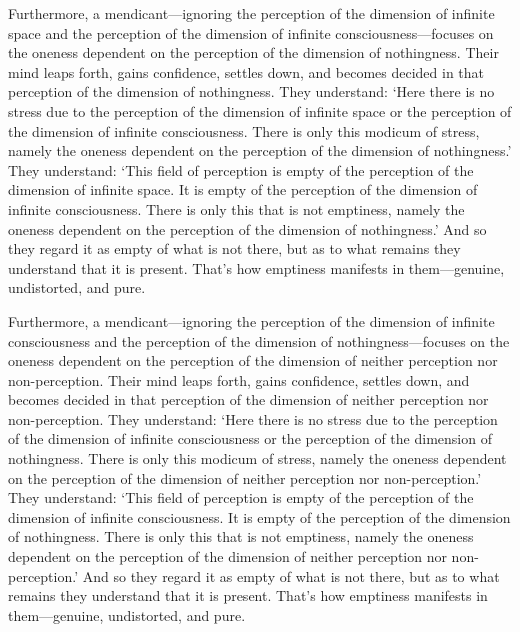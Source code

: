 \documentclass[12pt,openany]{book}%
\begin{document}
Furthermore, a mendicant—ignoring the perception of the dimension of infinite space and the perception of the dimension of infinite consciousness—focuses on the oneness dependent on the perception of the dimension of nothingness. Their mind leaps forth, gains confidence, settles down, and becomes decided in that perception of the dimension of nothingness. They understand: ‘Here there is no stress due to the perception of the dimension of infinite space or the perception of the dimension of infinite consciousness. There is only this modicum of stress, namely the oneness dependent on the perception of the dimension of nothingness.’ They understand: ‘This field of perception is empty of the perception of the dimension of infinite space. It is empty of the perception of the dimension of infinite consciousness. There is only this that is not emptiness, namely the oneness dependent on the perception of the dimension of nothingness.’ And so they regard it as empty of what is not there, but as to what remains they understand that it is present. That’s how emptiness manifests in them—genuine, undistorted, and pure. 

Furthermore, a mendicant—ignoring the perception of the dimension of infinite consciousness and the perception of the dimension of nothingness—focuses on the oneness dependent on the perception of the dimension of neither perception nor non-perception. Their mind leaps forth, gains confidence, settles down, and becomes decided in that perception of the dimension of neither perception nor non-perception. They understand: ‘Here there is no stress due to the perception of the dimension of infinite consciousness or the perception of the dimension of nothingness. There is only this modicum of stress, namely the oneness dependent on the perception of the dimension of neither perception nor non-perception.’ They understand: ‘This field of perception is empty of the perception of the dimension of infinite consciousness. It is empty of the perception of the dimension of nothingness. There is only this that is not emptiness, namely the oneness dependent on the perception of the dimension of neither perception nor non-perception.’ And so they regard it as empty of what is not there, but as to what remains they understand that it is present. That’s how emptiness manifests in them—genuine, undistorted, and pure. 
\end{document}
